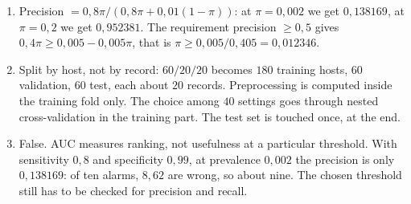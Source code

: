 \begin{enumerate}[label=\textbf{27.\arabic*}]
  \item Precision $=0{,}8\pi/(0{,}8\pi+0{,}01(1-\pi))$: at $\pi=0{,}002$ we get
        $0{,}138169$, at $\pi=0{,}2$ we get $0{,}952381$. The requirement precision
        $\ge0{,}5$ gives $0{,}4\pi\ge0{,}005-0{,}005\pi$, that is
        $\pi\ge0{,}005/0{,}405=0{,}012346$.

  \item Split by host, not by record: $60/20/20$ becomes $180$ training hosts,
        $60$ validation, $60$ test, each about $20$ records. Preprocessing is
        computed inside the training fold only. The choice among $40$ settings goes
        through nested cross-validation in the training part. The test set is touched
        once, at the end.

  \item False. AUC measures ranking, not usefulness at a particular threshold. With
        sensitivity $0{,}8$ and specificity $0{,}99$, at prevalence $0{,}002$ the
        precision is only $0{,}138169$: of ten alarms, $8{,}62$ are wrong, so about
        nine. The chosen
        threshold still has to be checked for precision and recall.
\end{enumerate}

